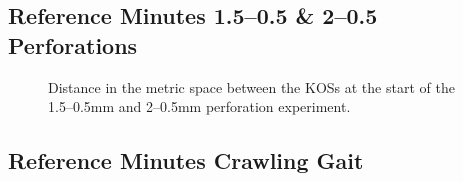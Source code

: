 \FloatBarrier
\subsection{Reference Minutes 1.5--0.5 \& 2--0.5 Perforations}
\begin{table}[ht]
    \centering
    \caption{Numerical values of the reference minute metrics for the 1.5--0.5\si{\mm} and 2--0.5\si{\mm} perforation experiment.}
    \label{tab:ref-150-200}
    \begin{subtable}{\linewidth}
        \centering\vspace*{1em}
        \caption{Baseline controller}
        
    \end{subtable}
    \begin{subtable}[t]{\linewidth}
        \centering
        \vspace*{1em}
        \caption{(Disabled) target adapter}
        
    \end{subtable}
\end{table}

\begin{figure}[ht]
    \centering
    
    \vspace*{-1em}
    \caption{Distance in the metric space between the KOSs at the start of the 1.5--0.5\si{\mm} and 2--0.5\si{\mm} perforation experiment.}
    \label{fig:ref-150-200}
\end{figure}

\FloatBarrier
\subsection{Reference Minutes Crawling Gait}
\begin{table}[ht]
    \centering
    \caption{Numerical values of the reference minute metrics for the crawling gait experiment.}
    \label{tab:ref-crawl}
    \begin{subtable}[b]{0.45\linewidth}
        \centering
        \vspace*{1em}
        \caption{Baseline controller}
        
    \end{subtable}
    \hfill
    \begin{subtable}[b]{0.25\linewidth}
        \centering
        \vspace*{1em}
        \caption{(Disabled) pretrained target adapter}
        
    \end{subtable}
    \hfill
    \begin{subtable}[b]{0.25\linewidth}
        \centering
        \vspace*{1em}
        \caption{(Disabled) online target adapter}
        
    \end{subtable}
\end{table}

